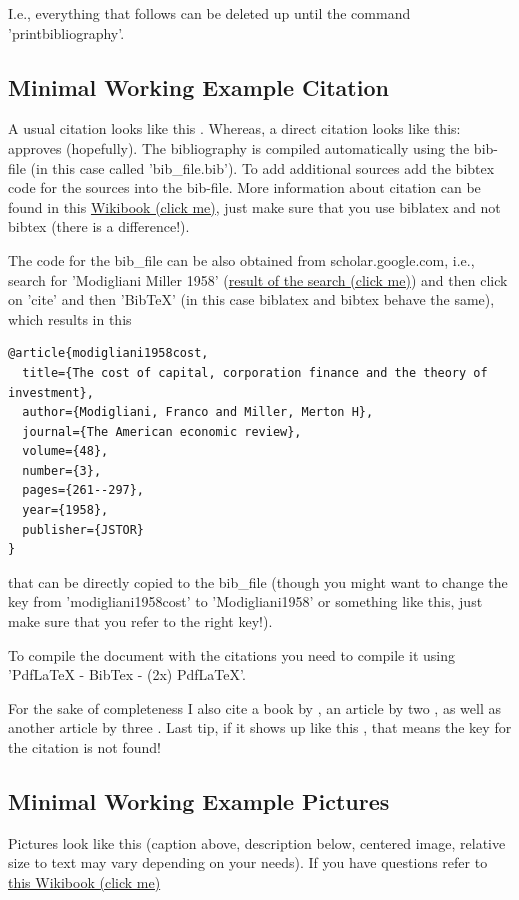 \documentclass[12pt,a4paper]{article}
\begin{document}
I.e., everything that follows can be deleted up until the command 'printbibliography'.
\subsection{Minimal Working Example Citation}
A usual citation looks like this \parencite{R2016}. Whereas, a direct citation looks like this: \textcite{Leifeld2013} approves (hopefully). The bibliography is compiled automatically using the bib-file (in this case called 'bib\_file.bib'). To add additional sources add the bibtex code for the sources into the bib-file. More information about citation can be found in this \href{https://en.wikibooks.org/wiki/LaTeX/Bibliography_Management#biblatex}{Wikibook (click me)}, just make sure that you use biblatex and not bibtex (there is a difference!).

The code for the bib\_file can be also obtained from scholar.google.com, i.e., search for 'Modigliani Miller 1958' (\href{https://scholar.google.de/scholar?hl=en&q=modigliani+miller+1958&btnG=&as_sdt=1%2C5&as_sdtp=}{result of the search (click me)}) and then click on 'cite' and then 'BibTeX' (in this case biblatex and bibtex behave the same), which results in this 
\begin{verbatim}
@article{modigliani1958cost,
  title={The cost of capital, corporation finance and the theory of investment},
  author={Modigliani, Franco and Miller, Merton H},
  journal={The American economic review},
  volume={48},
  number={3},
  pages={261--297},
  year={1958},
  publisher={JSTOR}
}
\end{verbatim}

that can be directly copied to the bib\_file (though you might want to change the key from 'modigliani1958cost' to 'Modigliani1958' or something like this, just make sure that you refer to the right key!).

To compile the document with the citations you need to compile it using 'PdfLaTeX - BibTex - (2x) PdfLaTeX'.

For the sake of completeness I also cite a book by \textcite{Wilkinson2006}, an article by two \textcite{Modigliani1958}, as well as another article by three \textcite{Johnson2000}. Last tip, if it shows up like this \textcite{UnknownKey2000}, that means the key for the citation is not found!

\subsection{Minimal Working Example Pictures}
Pictures look like this (caption above, description below, centered image, relative size to text may vary depending on your needs). If you have questions refer to \href{https://en.wikibooks.org/wiki/LaTeX/Floats,_Figures_and_Captions}{this Wikibook (click me)}
\end{document}
